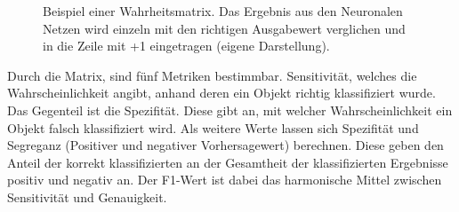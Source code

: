 \begin{figure}[!b]
\begin{center}
\caption[Beispiel einer Warheitsmatrix $W$]{Beispiel einer Wahrheitsmatrix. Das Ergebnis aus den Neuronalen Netzen wird einzeln mit den richtigen Ausgabewert verglichen und in die Zeile mit +1 eingetragen (eigene Darstellung).}\label{cap:conv_matrix}
\end{center}
\end{figure}\label{fig:conv_matrix}

Durch die Matrix, sind fünf Metriken bestimmbar. Sensitivität, welches die Wahrscheinlichkeit angibt, anhand deren ein Objekt richtig klassifiziert wurde. Das Gegenteil ist die Spezifität. Diese gibt an, mit welcher Wahrscheinlichkeit ein Objekt falsch klassifiziert wird. Als weitere Werte lassen sich Spezifität und Segreganz (Positiver und negativer Vorhersagewert) berechnen. Diese geben den Anteil der korrekt klassifizierten an der Gesamtheit der klassifizierten Ergebnisse positiv und negativ an. Der F1-Wert ist dabei das harmonische Mittel zwischen Sensitivität und Genauigkeit.

